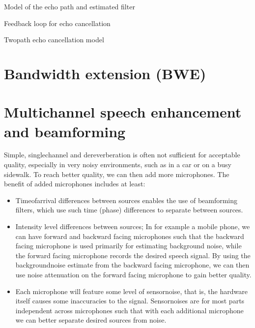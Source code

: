 \documentclass[letterpaper,10pt,english]{jupyterBook}
\begin{document}
\sphinxAtStartPar
Model of the echo path and estimated filter

\sphinxAtStartPar
{}

\sphinxAtStartPar
Feedback loop for echo cancellation

\sphinxAtStartPar
{}

\sphinxAtStartPar
Two\sphinxhyphen{}path echo cancellation model

\sphinxAtStartPar
{}

\sphinxstepscope


\section{Bandwidth extension (BWE)}
\label{\detokenize{Enhancement/Bandwidth_extension_BWE:bandwidth-extension-bwe}}\label{\detokenize{Enhancement/Bandwidth_extension_BWE::doc}}
\sphinxstepscope


\section{Multi\sphinxhyphen{}channel speech enhancement and beamforming}
\label{\detokenize{Enhancement/Multi-channel_speech_enhancement_and_beamforming:multi-channel-speech-enhancement-and-beamforming}}\label{\detokenize{Enhancement/Multi-channel_speech_enhancement_and_beamforming::doc}}
\sphinxAtStartPar
Simple, single\sphinxhyphen{}channel {\hyperref[\detokenize{Enhancement/Noise_attenuation::doc}]{}} and
dereverberation is often not sufficient for acceptable quality,
especially in very noisy environments, such as in a car or on a busy
sidewalk. To reach better quality, we can then add more microphones. The
benefit of added microphones includes at least:
\begin{itemize}
\item {} 
\sphinxAtStartPar
Time\sphinxhyphen{}of\sphinxhyphen{}arrival differences between sources enables the use of
beamforming filters, which use such time (phase) differences to
separate between sources.

\item {} 
\sphinxAtStartPar
Intensity level differences between sources; In for example a mobile
phone, we can have forward and backward facing microphones such that
the backward facing microphone is used primarily for estimating
background noise, while the forward facing microphone records the
desired speech signal. By using the background\sphinxhyphen{}noise estimate from
the backward facing microphone, we can then use noise attenuation on
the forward facing microphone to gain better quality.

\item {} 
\sphinxAtStartPar
Each microphone will feature some level of sensor\sphinxhyphen{}noise, that is,
the hardware itself causes some inaccuracies to the signal.
Sensor\sphinxhyphen{}noises are for most parts independent across microphones such
that with each additional microphone we can better separate desired
sources from noise.

\end{itemize}
\end{document}
